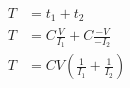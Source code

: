 \documentclass[12pt]{article}
\begin{document}
\begin{align*}
T &= t_{1} + t_{2}\\
T &= C\frac{V}{I_1} + C\frac{-V}{-I_2}\\
T &= CV \left( \frac{1}{I_1} + \frac{1}{I_2} \right)
\end{align*}
\end{document}
